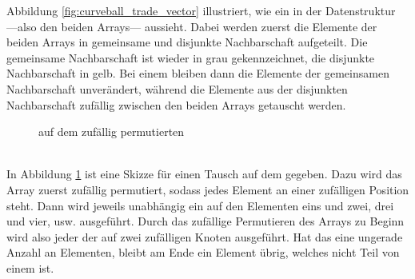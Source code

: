 Abbildung \ref{fig:curveball_trade_vector} illustriert, wie ein \ct{} 
in der Datenstruktur ---also den beiden Arrays--- aussieht. Dabei werden zuerst die Elemente
der beiden Arrays in gemeinsame und disjunkte Nachbarschaft aufgeteilt. Die gemeinsame Nachbarschaft ist
wieder in grau gekennzeichnet, die disjunkte Nachbarschaft in gelb. 
Bei einem \ct{} bleiben dann die Elemente 
der gemeinsamen Nachbarschaft unverändert, während die Elemente aus der 
disjunkten Nachbarschaft zufällig zwischen den beiden 
Arrays getauscht werden.
%
%
% 
\begin{figure}
\centering
  \caption{\gc{} auf dem zufällig permutierten \partvek}
  \label{fig:global_curveball_trade_vector}
  
\end{figure}
%
%
%
\\

In Abbildung \ref{fig:global_curveball_trade_vector} ist eine Skizze für einen \gc{} Tausch
auf dem \partvek{} gegeben.
Dazu wird das Array zuerst zufällig permutiert, sodass jedes Element an einer zufälligen
Position steht.
Dann wird jeweils unabhängig ein \ct{} auf den Elementen eins und zwei, drei und vier, usw. ausgeführt.
Durch das zufällige Permutieren des Arrays zu Beginn wird also jeder der  auf zwei zufälligen
Knoten ausgeführt. Hat das \partvek{} eine ungerade Anzahl an Elementen, bleibt am Ende ein Element übrig, 
welches nicht Teil von einem \ct{} ist. 






